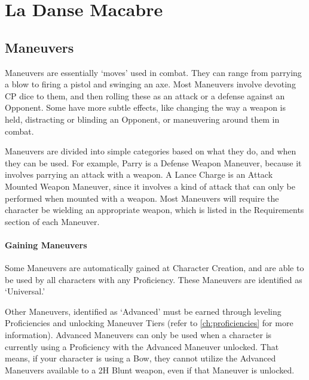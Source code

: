 \documentclass[oneside,11pt,english]{book}
\begin{document}
\part[Game Mechanics]{La Danse Macabre}

\chapter{Maneuvers}\label{ch:Maneuvers} %
\startcontents[chapters]
\clearpage
Maneuvers are essentially ‘moves’ used in combat. They can range from parrying a
blow to firing a pistol and swinging an axe. Most Maneuvers involve devoting CP
dice to them, and then rolling these as an attack or a defense against an
Opponent. Some have more subtle effects, like changing the way a weapon is held,
distracting or blinding an Opponent, or maneuvering around them in combat. 

Maneuvers are divided into simple categories based on what they do, and when
they can be used. For example, Parry is a Defense Weapon Maneuver, because it
involves parrying an attack with a weapon. A Lance Charge is an Attack Mounted
Weapon Maneuver, since it involves a kind of attack that can only be performed
when mounted with a weapon. Most Maneuvers will require the character be
wielding an appropriate weapon, which is listed in the Requirements section of
each Maneuver. 


\subsection{Gaining Maneuvers}
Some Maneuvers are automatically gained at Character Creation, and are able to
be used by all characters with any Proficiency. These Maneuvers are identified
as ‘Universal.’ 

Other Maneuvers, identified as ‘Advanced’ must be earned through leveling
Proficiencies and unlocking Maneuver Tiers (refer to \autoref{ch:proficiencies}
for more information). Advanced Maneuvers can only be used when a character is
currently using a Proficiency with the Advanced Maneuver unlocked. That means,
if your character is using a Bow, they cannot utilize the Advanced Maneuvers
available to a 2H Blunt weapon, even if that Maneuver is unlocked. 
\end{document}
